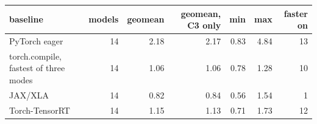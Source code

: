 \begin{tabular}{lrrrrrr}
\toprule
baseline & models & geomean & geomean, C3 only & min & max & faster on \\
\midrule
PyTorch eager & 14 & 2.18 & 2.17 & 0.83 & 4.84 & 13 \\
torch.compile, fastest of three modes & 14 & 1.06 & 1.06 & 0.78 & 1.28 & 10 \\
JAX/XLA & 14 & 0.82 & 0.84 & 0.56 & 1.54 & 1 \\
Torch-TensorRT & 14 & 1.15 & 1.13 & 0.71 & 1.73 & 12 \\
\bottomrule
\end{tabular}

